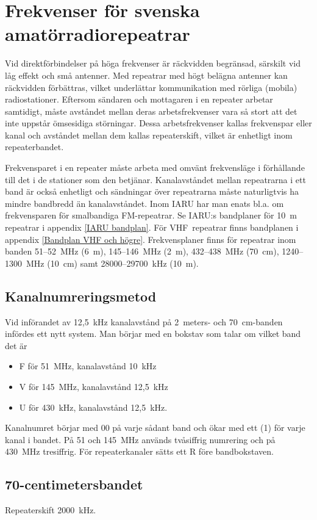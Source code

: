 \chapter[Svenska repeatrar]{Frekvenser för svenska amatörradiorepeatrar}
\label{svenska repeatrar}

Vid direktförbindelser på höga frekvenser är räckvidden begränsad,
särskilt vid låg effekt och små antenner.
Med repeatrar med högt belägna antenner kan räckvidden förbättras,
vilket underlättar kommunikation med rörliga (mobila) radiostationer.
Eftersom sändaren och mottagaren i en repeater arbetar samtidigt, måste
avståndet mellan deras arbetsfrekvenser vara så stort att det inte uppstår
ömsesidiga störningar.
Dessa arbetsfrekvenser kallas frekvenspar eller kanal och avståndet mellan dem
kallas repeaterskift, vilket är enhetligt inom repeaterbandet.

Frekvensparet i en repeater måste arbeta med omvänt frekvensläge i förhållande
till det i de stationer som den betjänar.
Kanalavståndet mellan repeatrarna i ett band är också enhetligt och sändningar
över repeatrarna måste naturligtvis ha mindre bandbredd än kanalavståndet.
Inom IARU har man enats bl.a. om frekvensparen för smalbandiga FM-repeatrar.
Se IARU:s bandplaner för 10~m repeatrar i appendix \ref{IARU bandplan}.
För VHF~repeatrar finns bandplanen i appendix \ref{Bandplan VHF och högre}.
Frekvensplaner finns för repeatrar inom banden 51--52~MHz (6~m), 145--146~MHz
(2~m), 432--438~MHz (70~cm), 1240--1300~MHz (10~cm) samt 28000--29700~kHz (10~m).

\section{Kanalnumreringsmetod}
Vid införandet av 12,5~kHz kanalavstånd på 2~meters- och 70~cm-banden infördes
ett nytt system.
Man börjar med en bokstav som talar om vilket band det är
\begin{itemize}
  \item F för 51~MHz, kanalavstånd 10~kHz
  \item V för 145~MHz, kanalavstånd 12,5~kHz
  \item U för 430~kHz, kanalavstånd 12,5~kHz.
\end{itemize}
Kanalnumret börjar med 00 på varje sådant band och ökar med ett (1) för varje
kanal i bandet.
På 51 och 145~MHz används tvåsiffrig numrering och på 430~MHz tresiffrig.
För repeaterkanaler sätts ett R före bandbokstaven.

\section{70-centimetersbandet}
Repeaterskift 2000~kHz.

